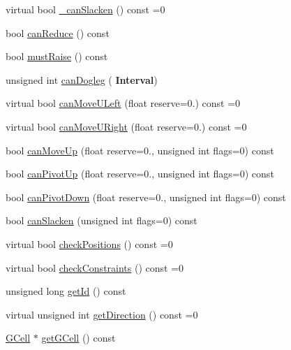 \begin{DoxyCompactItemize}
\item 
virtual bool \hyperlink{classKatabatic_1_1AutoSegment_a676fcb7ece71d129b7a4d87a3f2e07aa}{\+\_\+can\+Slacken} () const =0
\item 
bool \hyperlink{classKatabatic_1_1AutoSegment_af1a231b2324a486d4ef61b247886cdeb}{can\+Reduce} () const
\item 
bool \hyperlink{classKatabatic_1_1AutoSegment_a449ebb156fd51b04bbc029a657b4cded}{must\+Raise} () const
\item 
unsigned int \hyperlink{classKatabatic_1_1AutoSegment_a43c865bcfcfd6132352a9ac8a84c25cd}{can\+Dogleg} (\textbf{ Interval})
\item 
virtual bool \hyperlink{classKatabatic_1_1AutoSegment_aad55626c9d793a0b08bcff5be2a5ad0c}{can\+Move\+U\+Left} (float reserve=0.) const =0
\item 
virtual bool \hyperlink{classKatabatic_1_1AutoSegment_a096deb8a143f098eac2bff9ab9c52243}{can\+Move\+U\+Right} (float reserve=0.) const =0
\item 
bool \hyperlink{classKatabatic_1_1AutoSegment_a6482341a342eb6e6b3b43f13fd4436f6}{can\+Move\+Up} (float reserve=0., unsigned int flags=0) const
\item 
bool \hyperlink{classKatabatic_1_1AutoSegment_a6cca3afced729492cae6649a92dc7e88}{can\+Pivot\+Up} (float reserve=0., unsigned int flags=0) const
\item 
bool \hyperlink{classKatabatic_1_1AutoSegment_a24de580d1a371b8d27640cbc3431990b}{can\+Pivot\+Down} (float reserve=0., unsigned int flags=0) const
\item 
bool \hyperlink{classKatabatic_1_1AutoSegment_adec088de3c4c47a28ee9d58eb6d9cf85}{can\+Slacken} (unsigned int flags=0) const
\item 
virtual bool \hyperlink{classKatabatic_1_1AutoSegment_af026a81002bd907f1ccd4a4784aaa1db}{check\+Positions} () const =0
\item 
virtual bool \hyperlink{classKatabatic_1_1AutoSegment_a3d5732fd10b4a05076981066a4674487}{check\+Constraints} () const =0
\item 
unsigned long \hyperlink{classKatabatic_1_1AutoSegment_afdedcef127ad2a3677a5b48d7d3453f3}{get\+Id} () const
\item 
virtual unsigned int \hyperlink{classKatabatic_1_1AutoSegment_ae35b78590ed6aa546b626ef95f28c533}{get\+Direction} () const =0
\item 
\hyperlink{classKatabatic_1_1GCell}{G\+Cell} $\ast$ \hyperlink{classKatabatic_1_1AutoSegment_a819cf639562a031a1e2e061fe1293d66}{get\+G\+Cell} () const

\end{DoxyCompactItemize}
